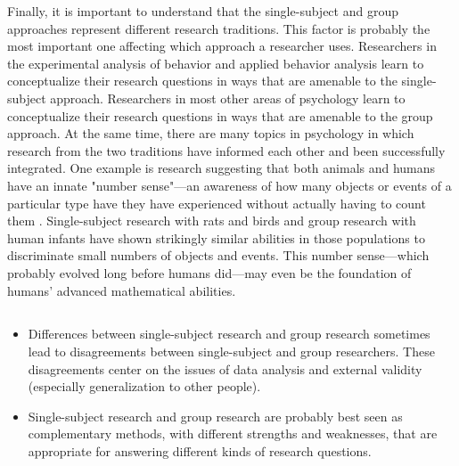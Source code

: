Finally, it is important to understand that the single-subject and group approaches represent different research traditions. This factor is probably the most important one affecting which approach a researcher uses. Researchers in the experimental analysis of behavior and applied behavior analysis learn to conceptualize their research questions in ways that are amenable to the single-subject approach. Researchers in most other areas of psychology learn to conceptualize their research questions in ways that are amenable to the group approach. At the same time, there are many topics in psychology in which research from the two traditions have informed each other and been successfully integrated. One example is research suggesting that both animals and humans have an innate "number sense"---an awareness of how many objects or events of a particular type have they have experienced without actually having to count them \citep{dehaene_number_2011}. Single-subject research with rats and birds and group research with human infants have shown strikingly similar abilities in those populations to discriminate small numbers of objects and events. This number sense---which probably evolved long before humans did---may even be the foundation of humans' advanced mathematical abilities.


 
\subsection{}

 
\begin{fullwidth}
\begin{itemize}

\item Differences between single-subject research and group research sometimes lead to disagreements between single-subject and group researchers. These disagreements center on the issues of data analysis and external validity (especially generalization to other people).
\item Single-subject research and group research are probably best seen as complementary methods, with different strengths and weaknesses, that are appropriate for answering different kinds of research questions.

\end{itemize}
\end{fullwidth}

 

 
\subsection{}

